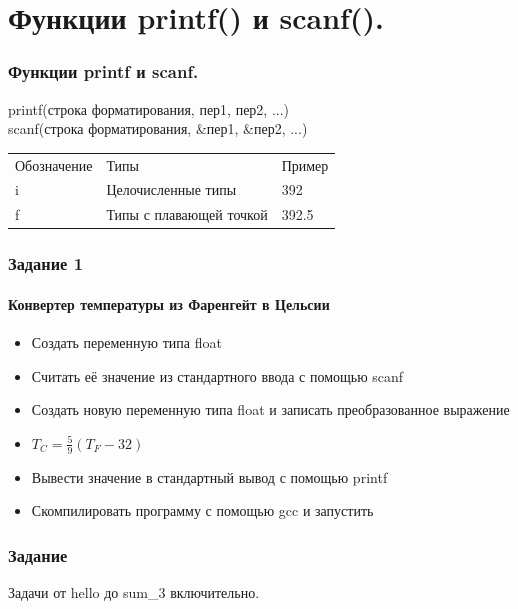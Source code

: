 \documentclass[12pt,pdf,hyperref={unicode}]{beamer}
\begin{document}
\fi

\section{Функции printf() и scanf().}

\begin{frame}
\frametitle{Функции printf и scanf.}
printf(строка форматирования, пер1, пер2, ...) \\
scanf(строка форматирования, \&пер1, \&пер2, ...)
\begin{center}
\begin{tabular}{ l l l }
  Обозначение & Типы & Пример \\
  i & Целочисленные типы & 392 \\
  f & Типы с плавающей точкой & 392.5 \\
\end{tabular}
\end{center}
\end{frame}



\iffalse

\begin{frame}
\frametitle{Задание 1} 
\framesubtitle{Конвертер температуры из Фаренгейт в Цельсии} 
\begin{center}
\begin{itemize}
\item Создать переменную типа float \\
\item Считать её значение из стандартного ввода с помощью scanf\\
\item Создать новую переменную типа float и записать преобразованное выражение \\
\item $T_C = \frac{5}{9}(T_F-32)$\\
\item Вывести значение в стандартный вывод с помощью printf\\
\item Скомпилировать программу с помощью gcc и запустить
\end{itemize}
\end{center}
\end{frame}


\begin{frame}
\frametitle{Задание} 
Задачи от hello до sum\_3 включительно.
\end{frame}
\end{document}
